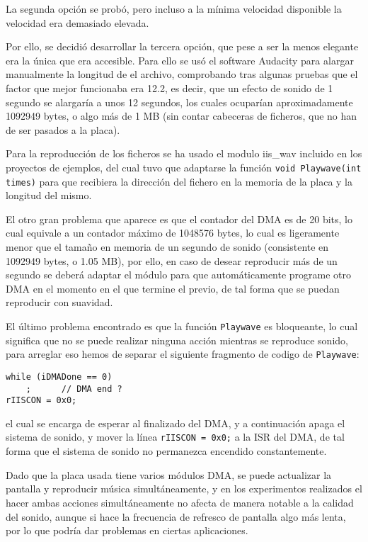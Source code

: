 \documentclass[12pt,letterpaper]{article}
\begin{document}
La segunda opción se probó, pero incluso a la mínima velocidad
disponible la velocidad era demasiado elevada.

Por ello, se decidió desarrollar la tercera opción, que pese a ser la
menos elegante era la única que era accesible. Para ello se usó el
software Audacity para alargar manualmente la longitud de el archivo,
comprobando tras algunas pruebas que el factor que mejor funcionaba
era 12.2, es decir, que un efecto de sonido de 1 segundo se alargaría
a unos 12 segundos, los cuales ocuparían aproximadamente 1092949
bytes, o algo más de 1 MB (sin contar cabeceras de ficheros, que no
han de ser pasados a la placa).

Para la reproducción de los ficheros se ha usado el modulo iis\_wav
incluido en los proyectos de ejemplos, del cual tuvo que adaptarse la
función \texttt{void Playwave(int times)} para que recibiera la
dirección del fichero en la memoria de la placa y la longitud del
mismo.

El otro gran problema que aparece es que el contador del DMA es de 20
bits, lo cual equivale a un contador máximo de 1048576 bytes, lo cual
es ligeramente menor que el tamaño en memoria de un segundo de sonido
(consistente en 1092949 bytes, o 1.05 MB), por ello, en caso de desear
reproducir más de un segundo se deberá adaptar el módulo para que
automáticamente programe otro DMA en el momento en el que termine el
previo, de tal forma que se puedan reproducir con suavidad.

El último problema encontrado es que la función \texttt{Playwave} es
bloqueante, lo cual significa que no se puede realizar ninguna acción
mientras se reproduce sonido, para arreglar eso hemos de separar el
siguiente fragmento de codigo de \texttt{Playwave}:
\lstset{language=C}
\begin{lstlisting}[frame=single]
while (iDMADone == 0)
	;      // DMA end ?
rIISCON = 0x0;
\end{lstlisting}
el cual se encarga de esperar al finalizado del DMA, y a continuación
apaga el sistema de sonido, y mover la línea \texttt{rIISCON = 0x0;} a
la ISR del DMA, de tal forma que el sistema de sonido no permanezca
encendido constantemente.

Dado que la placa usada tiene varios módulos DMA, se puede actualizar
la pantalla y reproducir música simultáneamente, y en los experimentos
realizados el hacer ambas acciones simultáneamente no afecta de manera
notable a la calidad del sonido, aunque si hace la frecuencia de
refresco de pantalla algo más lenta, por lo que podría dar problemas
en ciertas aplicaciones.
\end{document}
